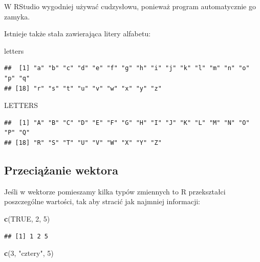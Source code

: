 \documentclass[]{book}
\newenvironment{Shaded}{\begin{snugshade}}{\end{snugshade}}
\newcommand{\KeywordTok}[1]{\textcolor[rgb]{0.13,0.29,0.53}{\textbf{#1}}}
\newcommand{\DecValTok}[1]{\textcolor[rgb]{0.00,0.00,0.81}{#1}}
\newcommand{\StringTok}[1]{\textcolor[rgb]{0.31,0.60,0.02}{#1}}
\newcommand{\OtherTok}[1]{\textcolor[rgb]{0.56,0.35,0.01}{#1}}
\newcommand{\NormalTok}[1]{#1}
\begin{document}
W RStudio wygodniej używać cudzysłowu, ponieważ program automatycznie go
zamyka.

Istnieje także stała zawierająca litery alfabetu:

\begin{Shaded}
\begin{Highlighting}[]
\NormalTok{letters}
\end{Highlighting}
\end{Shaded}

\begin{verbatim}
##  [1] "a" "b" "c" "d" "e" "f" "g" "h" "i" "j" "k" "l" "m" "n" "o" "p" "q"
## [18] "r" "s" "t" "u" "v" "w" "x" "y" "z"
\end{verbatim}

\begin{Shaded}
\begin{Highlighting}[]
\NormalTok{LETTERS}
\end{Highlighting}
\end{Shaded}

\begin{verbatim}
##  [1] "A" "B" "C" "D" "E" "F" "G" "H" "I" "J" "K" "L" "M" "N" "O" "P" "Q"
## [18] "R" "S" "T" "U" "V" "W" "X" "Y" "Z"
\end{verbatim}

\subsection{Przeciążanie wektora}\label{przeciazanie-wektora}

Jeśli w wektorze pomieszamy kilka typów zmiennych to R przekształci
poszczególne wartości, tak aby stracić jak najmniej informacji:

\begin{Shaded}
\begin{Highlighting}[]
\KeywordTok{c}\NormalTok{(}\OtherTok{TRUE}\NormalTok{, }\DecValTok{2}\NormalTok{, }\DecValTok{5}\NormalTok{)}
\end{Highlighting}
\end{Shaded}

\begin{verbatim}
## [1] 1 2 5
\end{verbatim}

\begin{Shaded}
\begin{Highlighting}[]
\KeywordTok{c}\NormalTok{(}\DecValTok{3}\NormalTok{, }\StringTok{"cztery"}\NormalTok{, }\DecValTok{5}\NormalTok{)}
\end{Highlighting}
\end{Shaded}
\end{document}
